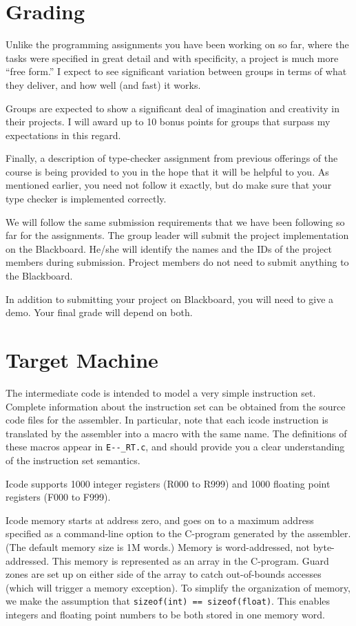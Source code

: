 \documentclass{article}
\begin{document}
\section{Grading}
%
Unlike the programming assignments you have been working on so far, where
the tasks were specified in great detail and with specificity, a project is
much more ``free form.'' I expect to see significant variation between
groups in terms of what they deliver, and how well (and fast) it works. 

Groups are expected to show a significant deal of imagination and creativity
in their projects. I will award up to 10 bonus points for groups that
surpass my expectations in this regard.

Finally, a description of type-checker assignment from previous offerings
of the course is being provided to you in the hope that it will be
helpful to you. As mentioned earlier, you need not follow it exactly,
but do make sure that your type checker is implemented correctly.

We will follow the same submission requirements that we have been following so
far for the assignments. The group leader will submit the project implementation
on the Blackboard. He/she will identify the names and the IDs of the project
members during submission. Project members do not need to submit anything to the
Blackboard.

In addition to submitting your project on Blackboard, you
will need to give a demo. Your final grade will depend
on both. 

\section{Target Machine} \label{targetlang}
%
The intermediate code is intended to model a very simple instruction set.
Complete information about the instruction set can be obtained from the source
code files for the assembler. In particular, note that each icode instruction is
translated by the assembler into a macro with the same name. The definitions of
these macros appear in \verb+E--_RT.c+, and should provide you a clear
understanding of the instruction set semantics.

Icode supports 1000 integer registers (R000 to R999) and 1000 floating point
registers (F000 to F999). 

Icode memory starts at address zero, and goes on to a maximum address specified
as a command-line option to the C-program generated by the assembler. (The
default memory size is 1M words.) Memory is word-addressed, not byte-addressed.
This memory is represented as an array in the C-program. Guard zones are set up
on either side of the array to catch out-of-bounds accesses (which will trigger
a memory exception). To simplify the organization of memory, we make the
assumption that \verb+sizeof(int) == sizeof(float)+. This enables integers and
floating point numbers to be both stored in one memory word.
\end{document}
